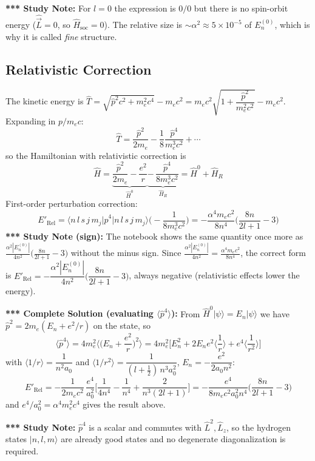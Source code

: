 \documentclass[11pt,a4paper]{article}
\begin{document}
\textbf{*** Study Note:} For $l=0$ the expression is $0/0$ but there is no spin-orbit energy ($\hat{\vec L}=0$, so $\hat H_{\text{soc}}=0$). The relative size is $\sim\alpha^2\approx 5\times10^{-5}$ of $E_n^{(0)}$, which is why it is called \textit{fine} structure.

\subsection{Relativistic Correction}
The kinetic energy is $\hat T = \sqrt{\hat p^2c^2 + m_e^2c^4} - m_ec^2 = m_ec^2\sqrt{1+\dfrac{\hat p^2}{m_e^2c^2}} - m_ec^2$. Expanding in $p/m_ec$:
\[
\hat T = \frac{\hat p^2}{2m_e} - \frac18\frac{\hat p^4}{m_e^3c^2} + \cdots
\]
so the Hamiltonian with relativistic correction is
\[
\hat H = \underbrace{\frac{\hat p^2}{2m_e} - \frac{e^2}{r}}_{\hat H^0} \underbrace{-\,\frac{\hat p^4}{8m_e^3c^2}}_{\hat H_R} = \hat H^0 + \hat H_R
\]
First-order perturbation correction:
\[
E'_{\text{Rel}} = \Big\langle n\,l\,s\,j\,m_j\Big|\hat p^4\Big|n\,l\,s\,j\,m_j\Big\rangle\Big(-\frac{1}{8m_e^3c^2}\Big) = -\frac{\alpha^4m_ec^2}{8n^4}\Big(\frac{8n}{2l+1}-3\Big)
\]
\textbf{*** Study Note (sign):} The notebook shows the same quantity once more as $\frac{\alpha^2|E_n^{(0)}|}{4n^2}\big(\frac{8n}{2l+1}-3\big)$ without the minus sign. Since $\frac{\alpha^2|E_n^{(0)}|}{4n^2}=\frac{\alpha^4m_ec^2}{8n^4}$, the correct form is $E'_{\text{Rel}} = -\dfrac{\alpha^2|E_n^{(0)}|}{4n^2}\Big(\dfrac{8n}{2l+1}-3\Big)$, always negative (relativistic effects lower the energy).

\textbf{*** Complete Solution (evaluating $\langle\hat p^4\rangle$):} From $\hat H^0|\psi\rangle = E_n|\psi\rangle$ we have $\hat p^2 = 2m_e(E_n + e^2/r)$ on the state, so
\[
\langle\hat p^4\rangle = 4m_e^2\Big\langle\Big(E_n+\frac{e^2}{r}\Big)^2\Big\rangle = 4m_e^2\Big[E_n^2 + 2E_ne^2\Big\langle\frac1r\Big\rangle + e^4\Big\langle\frac1{r^2}\Big\rangle\Big]
\]
with $\langle 1/r\rangle = \dfrac{1}{n^2a_0}$ and $\langle 1/r^2\rangle = \dfrac{1}{(l+\frac12)\,n^3a_0^2}$, $E_n=-\dfrac{e^2}{2a_0n^2}$:
\[
E'_{\text{Rel}} = -\frac{1}{2m_ec^2}\,\frac{e^4}{a_0^2}\Big[\frac1{4n^4} - \frac1{n^4} + \frac{2}{n^3(2l+1)}\Big]
= -\frac{e^4}{8m_ec^2a_0^2n^4}\Big(\frac{8n}{2l+1}-3\Big)
\]
and $e^4/a_0^2 = \alpha^4m_e^2c^4$ gives the result above. \checkmark

\textbf{*** Study Note:} $\hat p^4$ is a scalar and commutes with $\hat L^2,\hat L_z$, so the hydrogen states $|n,l,m\rangle$ are already good states and no degenerate diagonalization is required.
\end{document}
